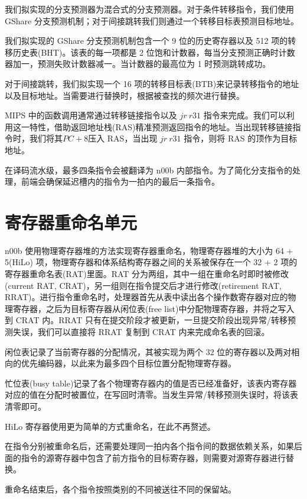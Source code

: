 \documentclass[blue,normal,cn]{elegantnote}
\begin{document}
我们拟实现的分支预测器为混合式的分支预测器。对于条件转移指令，我们使用 GShare 分支预测机制；对于间接跳转我们则通过一个转移目标表预测目标地址。

我们拟实现的 GShare 分支预测机制包含一个 9 位的历史寄存器以及 512 项的转移历史表(BHT)。该表的每一项都是 2 位饱和计数器，每当分支预测正确时计数器加一，预测失败计数器减一。当计数器的最高位为 1 时预测跳转成功。

对于间接跳转，我们拟实现一个 16 项的转移目标表(BTB)来记录转移指令的地址以及目标地址。当需要进行替换时，根据被查找的频次进行替换。

MIPS 中的函数调用通常通过转移链接指令以及 $jr\ r31$ 指令来完成。我们可以利用这一特性，借助返回地址栈(RAS)精准预测返回指令的地址。当出现转移链接指令时，我们将其$PC + 8$压入 RAS，当出现 $jr\ r31$ 指令，则将 RAS 的顶作为目标地址。

在译码流水级，最多四条指令会被翻译为 n00b 内部指令。为了简化分支指令的处理，前端会确保延迟槽内的指令为一拍内的最后一条指令。

\section{寄存器重命名单元}

n00b 使用物理寄存器堆的方法实现寄存器重命名，物理寄存器堆的大小为 64 + 5(HiLo) 项，物理寄存器和体系结构寄存器之间的关系被保存在一个 32 + 2 项的寄存器重命名表(RAT)里面。RAT 分为两组，其中一组在重命名时即时被修改(current RAT, CRAT)，另一组则在指令提交后才进行修改(retirement RAT, RRAT)。进行指令重命名时，处理器首先从表中读出各个操作数寄存器对应的物理寄存器，之后为目标寄存器从闲位表(free list)中分配物理寄存器，并将之写入到 CRAT 内。RRAT 只有在提交阶段才被更新，一旦提交阶段出现异常/转移预测失误，我们可以直接将 RRAT 复制到 CRAT 内来完成命名表的回滚。

闲位表记录了当前寄存器的分配情况，其被实现为两个 32 位的寄存器以及两对相向的优先编码器，以此来为最多四个目标位置分配物理寄存器。

忙位表(busy table)记录了各个物理寄存器内的值是否已经准备好，该表内寄存器对应的值在分配时被置位，在写回时清零。当发生异常/转移预测失误时，将该表清零即可。

HiLo 寄存器使用更为简单的方式重命名，在此不再赘述。

在指令分别被重命名后，还需要处理同一拍内各个指令间的数据依赖关系，如果后面的指令的源寄存器中包含了前方指令的目标寄存器，则需要对源寄存器进行替换。

重命名结束后，各个指令按照类别的不同被送往不同的保留站。
\end{document}
